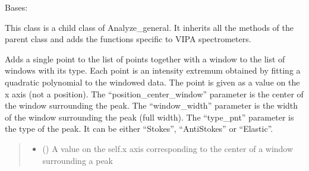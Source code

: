 \documentclass[letterpaper,10pt,english]{sphinxmanual}
\begin{document}

\begin{fulllineitems}
\label{\detokenize{_autosummary/HDF5_BLS.analyze:HDF5_BLS.analyze.Analyze_VIPA}}
\pysigstartsignatures
\pysiglinewithargsret
{}
{\sphinxparamcomma {}}
{}
\pysigstopsignatures
\sphinxAtStartPar
Bases: {\hyperref[\detokenize{_autosummary/HDF5_BLS.analyze:HDF5_BLS.analyze.Analyze_general}]{}}

\sphinxAtStartPar
This class is a child class of Analyze\_general. It inherits all the methods of the parent class and adds the functions specific to VIPA spectrometers.

\begin{fulllineitems}
\label{\detokenize{_autosummary/HDF5_BLS.analyze:HDF5_BLS.analyze.Analyze_VIPA.add_point}}
\pysigstartsignatures
\pysiglinewithargsret
{}
{\sphinxparamcomma {}\sphinxparamcomma {}}
{}
\pysigstopsignatures
\sphinxAtStartPar
Adds a single point to the list of points together with a window to the list of windows with its type. Each point is an intensity extremum obtained by fitting a quadratic polynomial to the windowed data.
The point is given as a value on the x axis (not a position).
The “position\_center\_window” parameter is the center of the window surrounding the peak. The “window\_width” parameter is the width of the window surrounding the peak (full width). The “type\_pnt” parameter is the type of the peak. It can be either “Stokes”, “Anti\sphinxhyphen{}Stokes” or “Elastic”.
\begin{quote}\begin{description}
\begin{itemize}
\item {} 
\sphinxAtStartPar
{} () \textendash{} A value on the self.x axis corresponding to the center of a window surrounding a peak


\end{itemize}
\end{description}
\end{quote}
\end{fulllineitems}
\end{fulllineitems}
\end{document}
